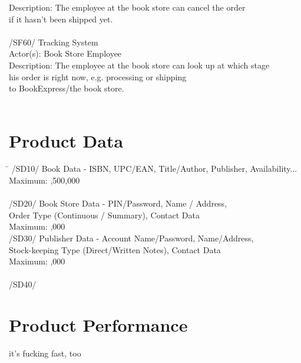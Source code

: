\documentclass[a4paper,draft]{article}
\begin{document}
\begin{tabbing}
 Description: \> The employee at the book store can cancel the order \\
 \> if it hasn't been shipped yet. \\
 \\
 /SF60/ \> Tracking System \\
 Actor(s): \> Book Store Employee \\
 Description: \> The employee at the book store can look up at which stage \\
 \> his order is right now, e.g. processing or shipping \\
 \> to BookExpress/the book store.\\
 \\
\end{tabbing} 
\clearpage
\section{Product Data}
\begin{tabbing}
\hspace{3cm}\=\kill
/SD10/ \>  Book Data - ISBN, UPC/EAN, Title/Author, Publisher, Availability... \\
Maximum: ,500,000 \\
\\
/SD20/ \> Book Store Data - PIN/Password, Name / Address,\\
 \> Order Type (Continuous / Summary), Contact Data\\
Maximum: ,000
\\
/SD30/ \> Publisher Data - Account Name/Password, Name/Address, \\
\> Stock-keeping Type (Direct/Written Notes), Contact Data\\
Maximum: ,000\\
\\
/SD40/ \> 
\end{tabbing} 
\section{Product Performance}
it's fucking fast, too
\end{document}
